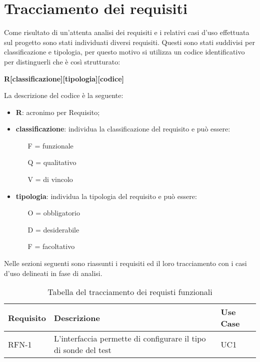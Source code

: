 \section{Tracciamento dei requisiti}

Come risultato di un'attenta analisi dei requisiti e i relativi casi d'uso effettuata sul progetto sono stati individuati diversi requisiti. Questi sono stati suddivisi per classificazione e tipologia, per questo motivo si utilizza un codice identificativo per distinguerli che è così strutturato:
\begin{center}
	\textbf{R[classificazione][tipologia][codice]}
\end{center}
La descrizione del codice è la seguente:
\begin{itemize}
	\item \textbf{R}: acronimo per Requisito;
	\item \textbf{classificazione}: individua la classificazione del requisito e può essere:
	\begin{itemize}
		\item [F =] funzionale
		\item [Q =] qualitativo
		\item [V =]  di vincolo
	\end{itemize}
	\item \textbf{tipologia}: individua la tipologia del requisito e può essere:
	\begin{itemize}
		\item [O =] obbligatorio
		\item [D =] desiderabile
		\item [F =] facoltativo
	\end{itemize}
\end{itemize}

Nelle sezioni seguenti sono riassunti i requisiti ed il loro tracciamento con i casi d'uso delineati in fase di analisi.

\newpage

\begin{table}%
\caption{Tabella del tracciamento dei requisti funzionali}
\label{tab:requisiti-funzionali}
\begin{tabularx}{\textwidth}{lXl}
\hline\hline
\textbf{Requisito} & \textbf{Descrizione} & \textbf{Use Case}\\
\hline
RFN-1     & L'interfaccia permette di configurare il tipo di sonde del test & UC1 \\
\hline
\end{tabularx}
\end{table}%

